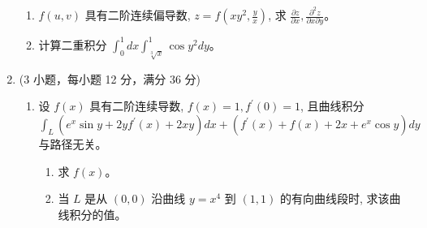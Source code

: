 \begin{enumerate}
\begin{enumerate}
\item
$f(u, v)$ 具有二阶连续偏导数, $z=f\left(x y^{2}, \frac{y}{x}\right)$, 求 $\frac{\partial z}{\partial x}, \frac{\partial^{2} z}{\partial x \partial y}$。


\item
计算二重积分 $\int_{0}^{1} d x \int_{\sqrt[3]{x}}^{1} \cos y^{2} d y$。
	
	
	
\end{enumerate}





\item 
(3 小题，每小题 12 分，满分 36 分)
\begin{enumerate}
	\item
设 $f(x)$ 具有二阶连续导数, $f(x)=1, f^{\prime}(0)=1$, 且曲线积分 $\int_{L}\left(e^{x} \sin y+2 y f^{\prime}(x)+2 x y\right) d x+\left(f^{\prime}(x)+f(x)+2 x+e^{x} \cos y\right) d y$ 与路径无关。
\begin{enumerate}
	\item
	求 $f(x)$。
	\item 
	当 $L$ 是从 $(0,0)$ 沿曲线 $y=x^{4}$ 到 $(1,1)$ 的有向曲线段时, 求该曲线积分的值。
	

\end{enumerate}
\end{enumerate}
\end{enumerate}
